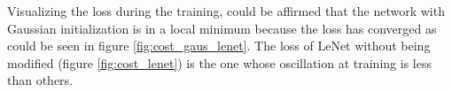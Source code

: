 Visualizing the loss during the training, could be affirmed that the network with Gaussian initialization is in a local minimum because the loss has converged as could be seen in figure \ref{fig:cost_gaus_lenet}. The loss of LeNet without being modified (figure  \ref{fig:cost_lenet}) is the one whose oscillation at training is less than others.\\\\

\begin{figure}[htb]    \centering

\end{figure}
